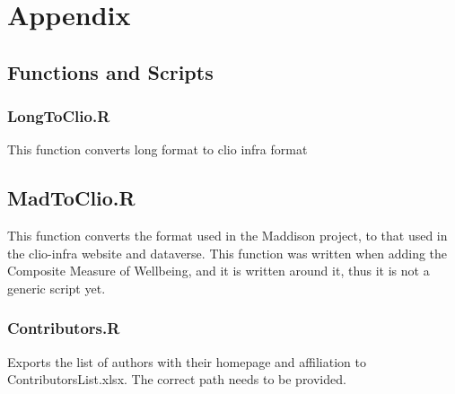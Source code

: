 \documentclass[a4paper]{article}
\begin{document}
%
%

\section{Appendix}
\subsection{Functions and Scripts}
\subsubsection{LongToClio.R}
This function converts long format to clio infra format
\subsection{MadToClio.R}
This function converts the format used in the Maddison project, to that
used in the clio-infra website and dataverse. This function was written when 
adding the Composite Measure of Wellbeing, and it is written around it, thus it 
is not a generic script yet.
\subsubsection{Contributors.R}
Exports the list of authors with their homepage and affiliation to 
ContributorsList.xlsx. The correct path needs to be provided.
\end{document}
